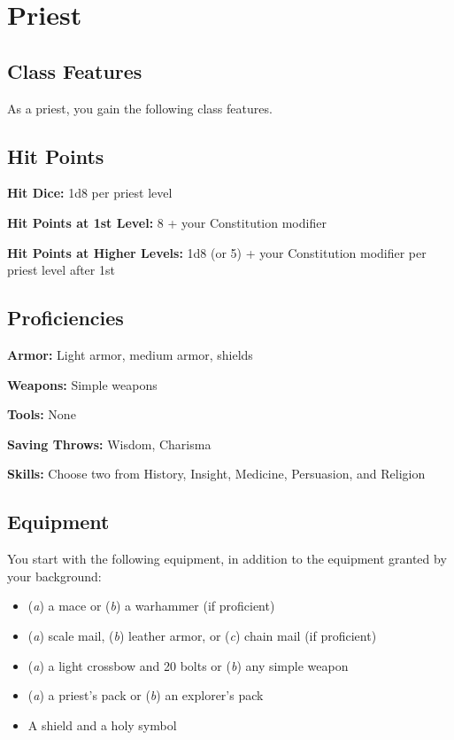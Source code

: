 \section{Priest}

\subsection{Class Features}

As a priest, you gain the following class features.

\subsection{Hit Points}

\textbf{Hit Dice:} 1d8 per priest level

\textbf{Hit Points at 1st Level:} 8 + your Constitution modifier

\textbf{Hit Points at Higher Levels:} 1d8 (or 5) + your Constitution modifier per priest level after 1st

\subsection{Proficiencies}

\textbf{Armor:} Light armor, medium armor, shields

\textbf{Weapons:} Simple weapons

\textbf{Tools:} None

\textbf{Saving Throws:} Wisdom, Charisma

\textbf{Skills:} Choose two from History, Insight, Medicine, Persuasion, and Religion

\subsection{Equipment}

You start with the following equipment, in addition to the equipment granted by your background:
\begin{itemize}
\item (\textit{a}) a mace or (\textit{b}) a warhammer (if proficient)
\item (\textit{a}) scale mail, (\textit{b}) leather armor, or (\textit{c}) chain mail (if proficient)
\item (\textit{a}) a light crossbow and 20 bolts or (\textit{b}) any simple weapon
\item (\textit{a}) a priest’s pack or (\textit{b}) an explorer’s pack
\item A shield and a holy symbol
\end{itemize}

